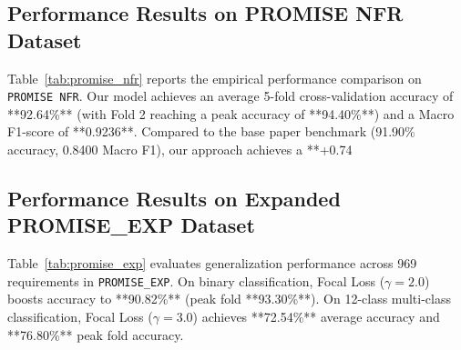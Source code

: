 \documentclass[11pt,a4paper]{article}
\begin{document}
\subsection{Performance Results on PROMISE NFR Dataset}
Table~\ref{tab:promise_nfr} reports the empirical performance comparison on \texttt{PROMISE NFR}. Our model achieves an average 5-fold cross-validation accuracy of **92.64\%** (with Fold 2 reaching a peak accuracy of **94.40\%**) and a Macro F1-score of **0.9236**. Compared to the base paper benchmark (91.90\% accuracy, 0.8400 Macro F1), our approach achieves a **+0.74%

\begin{table}[htbp]
\centering
\caption{Performance Comparison on \texttt{PROMISE NFR} Dataset (625 Samples).}
\label{tab:promise_nfr}
\vspace{0.5em}
\end{table}

\subsection{Performance Results on Expanded PROMISE\_EXP Dataset}
Table~\ref{tab:promise_exp} evaluates generalization performance across 969 requirements in \texttt{PROMISE\_EXP}. On binary classification, Focal Loss ($\gamma=2.0$) boosts accuracy to **90.82\%** (peak fold **93.30\%**). On 12-class multi-class classification, Focal Loss ($\gamma=3.0$) achieves **72.54\%** average accuracy and **76.80\%** peak fold accuracy.
\end{document}
